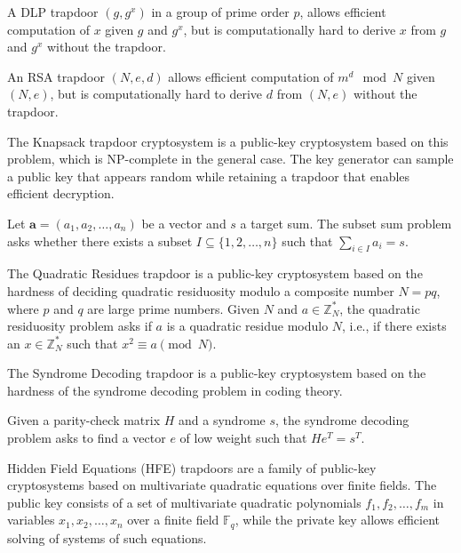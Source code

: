 \documentclass{iacrtrans}
\begin{document}
\begin{definition}
	A DLP trapdoor $(g, g^x)$ in a group of prime order $p$, allows efficient computation of $x$ given $g$ and $g^x$, but is computationally hard to derive $x$ from $g$ and $g^x$ without the trapdoor.
\end{definition}

\begin{definition}
	An RSA trapdoor $(N, e, d)$ allows efficient computation of $m^d \mod N$ given $(N, e)$, but is computationally hard to derive $d$ from $(N, e)$ without the trapdoor.
\end{definition}

The Knapsack trapdoor cryptosystem is a public-key cryptosystem based on this problem, which is NP-complete in the general case. The key generator can sample a public key that appears random while retaining a trapdoor that enables efficient decryption.

\begin{definition}
	Let $\mathbf{a} = (a_1, a_2, \ldots, a_n)$ be a vector and $s$ a target sum. The subset sum problem asks whether there exists a subset $I \subseteq \{1, 2, \ldots, n\}$ such that $\sum_{i \in I} a_i = s$.
\end{definition}

\begin{definition}
	The Quadratic Residues trapdoor is a public-key cryptosystem based on the hardness of deciding quadratic residuosity modulo a composite number $N = pq$, where $p$ and $q$ are large prime numbers. Given $N$ and $a \in \mathbb{Z}_N^*$, the quadratic residuosity problem asks if $a$ is a quadratic residue modulo $N$, i.e., if there exists an $x \in \mathbb{Z}_N^*$ such that $x^2 \equiv a \pmod{N}$.
\end{definition}

The Syndrome Decoding trapdoor is a public-key cryptosystem based on the hardness of the syndrome decoding problem in coding theory.

\begin{definition}
	Given a parity-check matrix $H$ and a syndrome $s$, the syndrome decoding problem asks to find a vector $e$ of low weight such that $H e^T = s^T$.
\end{definition}

\begin{definition}
	Hidden Field Equations (HFE) trapdoors are a family of public-key cryptosystems based on multivariate quadratic equations over finite fields. The public key consists of a set of multivariate quadratic polynomials $f_1, f_2, \ldots, f_m$ in variables $x_1, x_2, \ldots, x_n$ over a finite field $\mathbb{F}_q$, while the private key allows efficient solving of systems of such equations. 
\end{definition}
\end{document}
